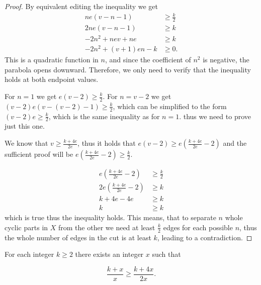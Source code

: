 \documentclass[12pt, twoside]{book}
\begin{document}
\begin{proof}
	By equivalent editing the inequality we get
	\begin{align*}
		ne(v-n-1)&\geq\frac{k}{2} \\
		2ne(v-n-1)&\geq k \\
		-2n^2+nev+ne&\geq k \\
		-2n^2+(v+1)en-k&\geq 0.
	\end{align*}
	This is a quadratic function in $n$, and since the coefficient of $n^2$ is negative, the parabola opens downward. Therefore, we only need to verify that the inequality holds at both endpoint values.
	
	For $n=1$ we get $e(v-2)\geq \frac{k}{2}$. For $n=v-2$ we get $(v-2)e(v-(v-2)-1)\geq\frac{k}{2}$, which can be simplified to the form $(v-2)e\geq\frac{k}{2}$, which is the same inequality as for $n=1$. thus we need to prove just this one.
	
	We know that $v\geq \frac{k+4e}{2e}$, thus it holds that $e(v-2)\geq e(\frac{k+4e}{2e}-2)$ and the sufficient proof will be $e(\frac{k+4e}{2e}-2)\geq \frac{k}{2}$.
	
	\begin{align*}
		e\left(\frac{k+4e}{2e}-2\right)&\geq \frac{k}{2} \\
		2e\left(\frac{k+4e}{2e}-2\right)&\geq k \\
		k+4e-4e&\geq k \\
		k&\geq k
	\end{align*}
	which is true thus the inequality holds. This means, that to separate $n$ whole cyclic parts in $X$ from the other we need at least $\frac{k}{2}$ edges for each possible $n$, thus the whole number of edges in the cut is at least $k$, leading to a contradiction.
\end{proof}



\begin{lemma}
	For each integer $k\geq 2$ there exists an integer $x$ such that
	
	$$\dfrac{k+x}{x}\geq \dfrac{k+4x}{2x}.$$
	
\end{lemma}
\end{document}
